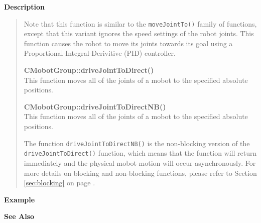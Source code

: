 {\bf Description}\\
\vspace{-12pt}
\begin{quote}
Note that this function is similar to the \texttt{moveJointTo()} family of functions, except
that this variant ignores the speed settings of the robot joints. This function causes
the robot to move its joints towards its goal using a Proportional-Integral-Derivitive (PID)
controller.

{\bf CMobotGroup::driveJointToDirect()}\\
This function moves all of the joints of a mobot to the specified absolute positions. 

{\bf CMobotGroup::driveJointToDirectNB()}\\
This function moves all of the joints of a mobot to the specified absolute positions. 

The function \texttt{driveJointToDirectNB()} is the non-blocking version of
the \texttt{driveJointToDirect()} function, which means that the function will return
immediately and the physical mobot motion will occur asynchronously. For
more details on blocking and non-blocking functions, please refer to 
Section \ref{sec:blocking} on page \pageref{sec:blocking}.\\
\end{quote}

\noindent
{\bf Example}\\
\noindent

\noindent
{\bf See Also}\\

